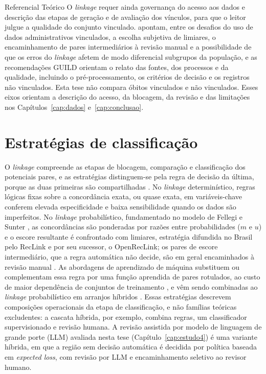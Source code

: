 \begin{chapter}{Referencial Teórico}
O \textit{linkage} requer ainda governança do acesso aos dados e descrição das etapas de geração e de avaliação dos vínculos, para que o leitor julgue a qualidade do conjunto vinculado.  apontam, entre os desafios do uso de dados administrativos vinculados, a escolha subjetiva de limiares, o encaminhamento de pares intermediários à revisão manual e a possibilidade de que os erros do \textit{linkage} afetem de modo diferencial subgrupos da população, e as recomendações GUILD \cite{Gilbert2018guild} orientam o relato das fontes, dos processos e da qualidade, incluindo o pré-processamento, os critérios de decisão e os registros não vinculados. Esta tese não compara óbitos vinculados e não vinculados. Esses eixos orientam a descrição do acesso, da blocagem, da revisão e das limitações nos Capítulos~\ref{cap:dados} e~\ref{cap:conclusao}.


\section{Estratégias de classificação}\label{sec:estrategias-linkage}

O \textit{linkage} compreende as etapas de blocagem, comparação e classificação dos potenciais pares, e as estratégias distinguem-se pela regra de decisão da última, porque as duas primeiras são compartilhadas \cite{Christen2012book}. No \textit{linkage} determinístico, regras lógicas fixas sobre a concordância exata, ou quase exata, em variáveis-chave conferem elevada especificidade e baixa sensibilidade quando os dados são imperfeitos. No \textit{linkage} probabilístico, fundamentado no modelo de Fellegi e Sunter \cite{Fellegi1969theory}, as concordâncias são ponderadas por razões entre probabilidades ($m$ e $u$) e o escore resultante é confrontado com limiares, estratégia difundida no Brasil pelo RecLink \cite{Camargo2000reclink} e por seu sucessor, o OpenRecLink; os pares de escore intermediário, que a regra automática não decide, são em geral encaminhados à revisão manual \cite{Harron2017challenges}. As abordagens de aprendizado de máquina substituem ou complementam essa regra por uma função aprendida de pares rotulados, ao custo de maior dependência de conjuntos de treinamento \cite{Christen2012book}, e vêm sendo combinadas ao \textit{linkage} probabilístico em arranjos híbridos \cite{Jiao2021hybrid, Lages2026trauma}. Essas estratégias descrevem composições operacionais da etapa de classificação, e não famílias teóricas excludentes: a cascata híbrida, por exemplo, combina regras, um classificador supervisionado e revisão humana. A revisão assistida por modelo de linguagem de grande porte (LLM) avaliada nesta tese (Capítulo~\ref{cap:estudo4}) é uma variante híbrida, em que a região sem decisão automática é decidida por política baseada em \textit{expected loss}, com revisão por LLM e encaminhamento seletivo ao revisor humano.


\end{chapter}
